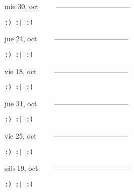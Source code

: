 \documentclass[letterpaper,10pt]{article}
\begin{document}
\begin{multicols}{3}
{mie 30, oct\ \ \ \ \ --------------------------------}
\begin{flushright}\begin{small}\texttt{:) :| :(}\end{small}\end{flushright}
\vfill
{jue 24, oct\ \ \ \ \ --------------------------------}
\begin{flushright}\begin{small}\texttt{:) :| :(}\end{small}\end{flushright}\par
\vfill
{vie 18, oct\ \ \ \ \ --------------------------------}
\begin{flushright}\begin{small}\texttt{:) :| :(}\end{small}\end{flushright}\par
\vfill
\end{multicols}
\vspace{1.05cm}

\begin{multicols}{3}
{jue 31, oct\ \ \ \ \ --------------------------------}
\begin{flushright}\begin{small}\texttt{:) :| :(}\end{small}\end{flushright}
\vfill
{vie 25, oct\ \ \ \ \ --------------------------------}
\begin{flushright}\begin{small}\texttt{:) :| :(}\end{small}\end{flushright}\par
\vfill
{sáb 19, oct\ \ \ \ \ --------------------------------}
\begin{flushright}\begin{small}\texttt{:) :| :(}\end{small}\end{flushright}\par
\vfill
\end{multicols}
\vspace{1.05cm}
\end{document}
